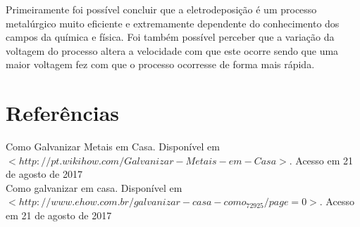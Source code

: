 \documentclass[12pt]{article}
\begin{document}
	Primeiramente foi possível concluir que a eletrodeposição é um processo metalúrgico muito eficiente e extremamente dependente do conhecimento dos campos da química e física. Foi também possível perceber que a variação da voltagem do processo altera a velocidade com que este ocorre sendo que uma maior voltagem fez com que o processo ocorresse de forma mais rápida.
	\pagebreak
	
	\section{Referências}
	Como Galvanizar Metais em Casa. Disponível em $<http://pt.wikihow.com/Galvanizar-Metais-em-Casa>$. Acesso em 21 de agosto de 2017\\
	Como galvanizar em casa. Disponível em $<http://www.ehow.com.br/galvanizar-casa-como_72925/page=0>$. Acesso em 21 de agosto de 2017
			
\end{document}

